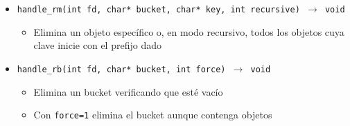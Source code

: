 \documentclass[12pt, letterpaper]{article}
\begin{document}
\begin{itemize}
\begin{itemize}
        \end{itemize}
    \item \texttt{handle\_rm(int fd, char* bucket, char* key, 
          int recursive) $\to$ void}
        \begin{itemize}
            \item Elimina un objeto específico o, en modo recursivo, 
                  todos los objetos cuya clave inicie con el prefijo dado
        \end{itemize}
    \item \texttt{handle\_rb(int fd, char* bucket, int force) $\to$ void}
        \begin{itemize}
            \item Elimina un bucket verificando que esté vacío
            \item Con \texttt{force=1} elimina el bucket aunque contenga 
                  objetos
        \end{itemize}


\end{itemize}
\end{document}
